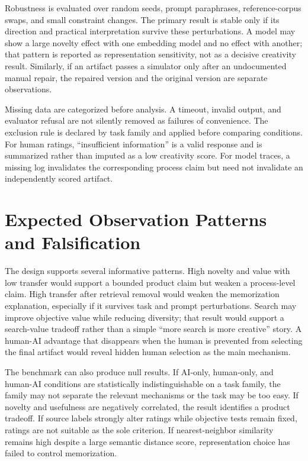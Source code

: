 \documentclass[conference]{IEEEtran}
\begin{document}
Robustness is evaluated over random seeds, prompt paraphrases, reference-corpus swaps,
and small constraint changes. The primary result is stable only if its direction and
practical interpretation survive these perturbations. A model may show a large novelty
effect with one embedding model and no effect with another; that pattern is reported as
representation sensitivity, not as a decisive creativity result. Similarly, if an
artifact passes a simulator only after an undocumented manual repair, the repaired
version and the original version are separate observations.

Missing data are categorized before analysis. A timeout, invalid output, and evaluator
refusal are not silently removed as failures of convenience. The exclusion rule is
declared by task family and applied before comparing conditions. For human ratings,
``insufficient information'' is a valid response and is summarized rather than
imputed as a low creativity score. For model traces, a missing log invalidates the
corresponding process claim but need not invalidate an independently scored artifact.

\section{Expected Observation Patterns and Falsification}
\label{sec:patterns}

The design supports several informative patterns. High novelty and value with low
transfer would support a bounded product claim but weaken a process-level claim. High
transfer after retrieval removal would weaken the memorization explanation, especially
if it survives task and prompt perturbations. Search may improve objective value while
reducing diversity; that result would support a search-value tradeoff rather than a
simple ``more search is more creative'' story. A human-AI advantage that disappears
when the human is prevented from selecting the final artifact would reveal hidden human
selection as the main mechanism.

The benchmark can also produce null results. If AI-only, human-only, and human-AI
conditions are statistically indistinguishable on a task family, the family may not
separate the relevant mechanisms or the task may be too easy. If novelty and usefulness
are negatively correlated, the result identifies a product tradeoff. If source labels
strongly alter ratings while objective tests remain fixed, ratings are not suitable as
the sole criterion. If nearest-neighbor similarity remains high despite a large
semantic distance score, representation choice has failed to control memorization.
\end{document}
